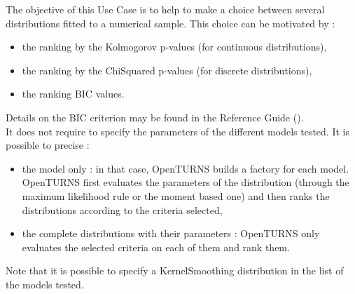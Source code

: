 \renewcommand{\filename}{docUC_InputWithData_ChoiceFittedDistributions.tex}
\renewcommand{\filetitle}{UC : Making a choice between multiple fitted distributions :  Kolmogorov ranking, ChiSquared ranking and BIC ranking}

\HeaderIIILevel




The objective of this Use Case is to help to make a choice between several distributions fitted to a numerical sample. This choice can be motivated by :
\begin{itemize}
\item the ranking by the Kolmogorov p-values (for continuous distributions),
\item the ranking by the ChiSquared p-values (for discrete distributions),
\item the ranking BIC values.
\end{itemize}


Details on the BIC criterion may be found in the Reference Guide ().\\

It does not  require to  specify the parameters of the different models tested. It is possible to precise :
\begin{itemize}
\item the model only : in that case, OpenTURNS builds a factory for each model. OpenTURNS first evaluates  the parameters of the distribution (through the maximum likelihood rule or the moment based one) and then  ranks the distributions according to the criteria selected,
\item the complete distributions with their parameters : OpenTURNS only evaluates the selected criteria  on each of them and rank them.
\end{itemize}
Note that it is possible to specify a KernelSmoothing distribution in the list of the models tested.

